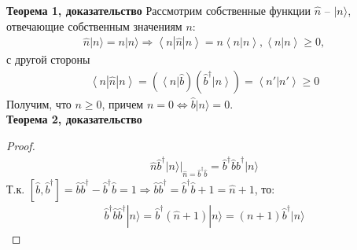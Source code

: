 \documentclass[__main__.tex]{subfiles}
\begin{document}
\textbf{Теорема 1, доказательство}
	Рассмотрим собственные функции $\hat{n}$ -- $|n\rangle$, отвечающие собственным значениям $n$:
	\begin{gather*}
	\hat{n}|n\rangle = n|n\rangle
	\Longrightarrow
	\left< n| \hat{n}|n\right> = n \left<n|n\right>, \left<n|n\right> \ge 0,
	\end{gather*}
	с другой стороны
	\begin{gather*}
	\left< n| \hat{n}|n\right> = (\left< n\right|\hat{b})(\hat{b}^\dagger\left|n\right>) =
	\left< n'|n'\right> \ge 0
	\end{gather*}
	Получим, что $n\ge 0$, причем $n=0\Leftrightarrow \hat{b}|n\rangle = 0$.\\
\textbf{Теорема 2, доказательство}
	\begin{proof}
		\begin{gather*}
		\hat{n}\hat{b}^\dagger|n\rangle
		|_{\hat{n}=\hat{b}^\dagger\hat{b}}
		=
		\hat{b}^\dagger\hat{b}\hat{b}^\dagger|n\rangle
		\end{gather*}
		Т.к. $[\hat{b},\hat{b}^\dagger]=\hat{b}\hat{b}^\dagger-\hat{b}^\dagger\hat{b}=1\Longrightarrow\hat{b}\hat{b}^\dagger=\hat{b}^\dagger\hat{b}+1=\hat{n}+1$, то:
		\begin{gather*}
		\hat{b}^\dagger\hat{b}\hat{b}^\dagger|n\rangle
		=
		\hat{b}^\dagger(\hat{n}+1)|n\rangle
		=
		(n+1)\hat{b}^\dagger|n\rangle
		\end{gather*}
	\end{proof}
\end{document}
